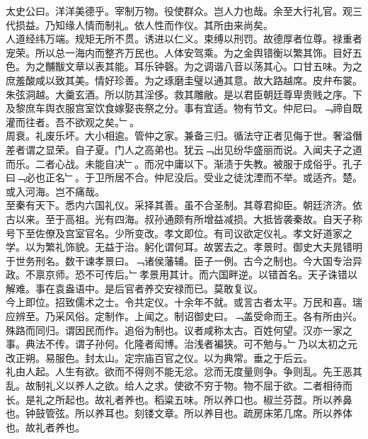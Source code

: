 \documentclass{zhvt-classic}
\begin{document}





\hspace*{2em}太史公曰。洋洋美德乎。宰制万物。役使群众。岂人力也哉。余至大行礼官。观三代损益。乃知缘人情而制礼。依人性而作仪。其所由来尚矣。\\
\hspace*{2em}人道经纬万端。规矩无所不贯。诱进以仁义。束缚以刑罚。故德厚者位尊。禄重者宠荣。所以总一海内而整齐万民也。人体安驾乘。为之金舆错衡以繁其饰。目好五色。为之黼黻文章以表其能。耳乐钟磬。为之调谐八音以荡其心。口甘五味。为之庶羞酸咸以致其美。情好珍善。为之琢磨圭璧以通其意。故大路越席。皮弁布裳。朱弦洞越。大羹玄酒。所以防其淫侈。救其雕敝。是以君臣朝廷尊卑贵贱之序。下及黎庶车舆衣服宫室饮食嫁娶丧祭之分。事有宜适。物有节文。仲尼曰。﹁禘自既灌而往者。吾不欲观之矣。﹂。\\
\hspace*{2em}周衰。礼废乐坏。大小相逾。管仲之家。兼备三归。循法守正者见侮于世。奢溢僭差者谓之显荣。自子夏。门人之高弟也。犹云﹁出见纷华盛丽而说。入闻夫子之道而乐。二者心战。未能自决﹂。而况中庸以下。渐渍于失教。被服于成俗乎。孔子曰﹁必也正名﹂。于卫所居不合。仲尼没后。受业之徒沈湮而不举。或适齐。楚。或入河海。岂不痛哉。\\
\hspace*{2em}至秦有天下。悉内六国礼仪。采择其善。虽不合圣制。其尊君抑臣。朝廷济济。依古以来。至于高祖。光有四海。叔孙通颇有所增益减损。大抵皆袭秦故。自天子称号下至佐僚及宫室官名。少所变改。孝文即位。有司议欲定仪礼。孝文好道家之学。以为繁礼饰貌。无益于治。躬化谓何耳。故罢去之。孝景时。御史大夫晁错明于世务刑名。数干谏孝景曰。﹁诸侯藩辅。臣子一例。古今之制也。今大国专治异政。不禀京师。恐不可传后。﹂孝景用其计。而六国畔逆。以错首名。天子诛错以解难。事在袁盎语中。是后官者养交安禄而已。莫敢复议。\\
\hspace*{2em}今上即位。招致儒术之士。令共定仪。十余年不就。或言古者太平。万民和喜。瑞应辨至。乃采风俗。定制作。上闻之。制诏御史曰。﹁盖受命而王。各有所由兴。殊路而同归。谓因民而作。追俗为制也。议者咸称太古。百姓何望。汉亦一家之事。典法不传。谓子孙何。化隆者闳博。治浅者褊狭。可不勉与。﹂乃以太初之元改正朔。易服色。封太山。定宗庙百官之仪。以为典常。垂之于后云。\\
\hspace*{2em}礼由人起。人生有欲。欲而不得则不能无忿。忿而无度量则争。争则乱。先王恶其乱。故制礼义以养人之欲。给人之求。使欲不穷于物。物不屈于欲。二者相待而长。是礼之所起也。故礼者养也。稻粱五味。所以养口也。椒兰芬茝。所以养鼻也。钟鼓管弦。所以养耳也。刻镂文章。所以养目也。疏房床笫几席。所以养体也。故礼者养也。\\
\end{document}
